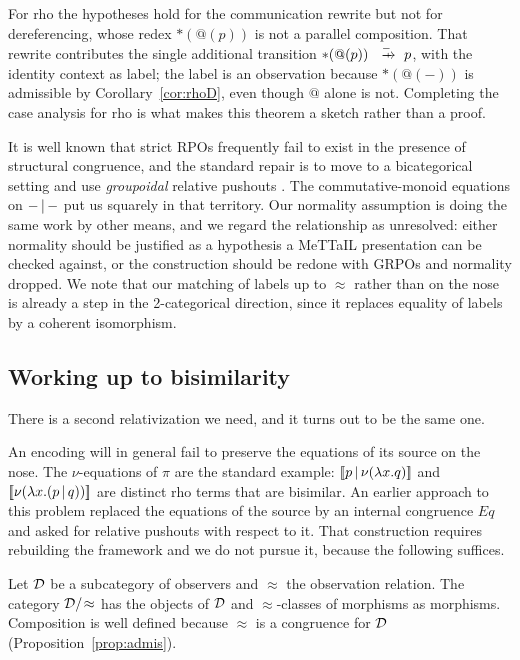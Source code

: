 \documentclass{article}
\begin{document}
For rho the hypotheses hold for the communication rewrite but not for dereferencing, whose redex $\ast(@(p))$ is not a parallel composition. That rewrite contributes the single additional transition $\ast(@(p))\xr{-}p$, with the identity context as label; the label is an observation because $\ast(@(-))$ is admissible by Corollary~\ref{cor:rhoD}, even though $@$ alone is not. Completing the case analysis for rho is what makes this theorem a sketch rather than a proof.

\begin{remark}
\label{rem:grpo}
    It is well known that strict RPOs frequently fail to exist in the presence of structural congruence, and the standard repair is to move to a bicategorical setting and use \emph{groupoidal} relative pushouts \citep{grpo,grpo2}. The commutative-monoid equations on $-\,|\,-$ put us squarely in that territory. Our normality assumption is doing the same work by other means, and we regard the relationship as unresolved: either normality should be justified as a hypothesis a MeTTaIL presentation can be checked against, or the construction should be redone with GRPOs and normality dropped. We note that our matching of labels up to $\approx$ rather than on the nose is already a step in the 2-categorical direction, since it replaces equality of labels by a coherent isomorphism.
\end{remark}

\subsection{Working up to bisimilarity}
\label{sec:quot}

There is a second relativization we need, and it turns out to be the same one.

An encoding will in general fail to preserve the equations of its source on the nose. The $\nu$-equations of $\pi$ are the standard example: $[\![p\,|\,\nu(\lambda x.q)]\!]$ and $[\![\nu(\lambda x.(p\,|\, q))]\!]$ are distinct rho terms that are bisimilar. An earlier approach to this problem replaced the equations of the source by an internal congruence $Eq$ and asked for relative pushouts with respect to it. That construction requires rebuilding the framework and we do not pursue it, because the following suffices.

\begin{definition}
\label{def:dquot}
    Let $\mathcal{D}$ be a subcategory of observers and $\approx$ the observation relation. The category $\mathcal{D}/\!\approx$ has the objects of $\mathcal{D}$ and $\approx$-classes of morphisms as morphisms. Composition is well defined because $\approx$ is a congruence for $\mathcal{D}$ (Proposition~\ref{prop:admis}).
\end{definition}
\end{document}
